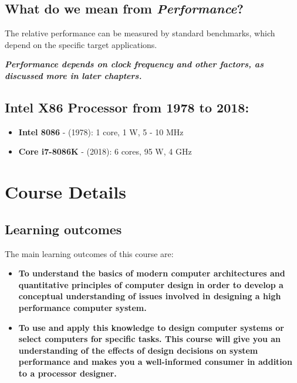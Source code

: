 \documentclass[
  12pt,
  a4paper,
]{report}
\begin{document}
\label{PerformanceQuestion}
\subsection{\texorpdfstring{What do we mean from
\emph{Performance}?}{What do we mean from Performance?}}\label{what-do-we-mean-from-performance}

The relative performance can be measured by standard benchmarks, which
depend on the specific target applications.

\textbf{\emph{Performance depends on clock frequency and other factors,
as discussed more in later chapters.}}

\label{IntelX86}
\subsection{Intel X86 Processor from 1978 to
2018:}\label{intel-x86-processor-from-1978-to-2018}

\begin{itemize}
\item
  \textbf{Intel 8086} - (1978): 1 core, 1 W, 5 - 10 MHz
\item
  \textbf{Core i7-8086K} - (2018): 6 cores, 95 W, 4 GHz
\end{itemize}

\label{CourseDetails}
\section{Course Details}\label{course-details}

\label{LearningOutcomes}
\subsection{Learning outcomes}\label{learning-outcomes}

The main learning outcomes of this course are:

\begin{itemize}
\item
  \textbf{To understand the basics of modern computer architectures and
  quantitative principles of computer design in order to develop a
  conceptual understanding of issues involved in designing a high
  performance computer system.}
\item
  \textbf{To use and apply this knowledge to design computer systems or
  select computers for specific tasks. This course will give you an
  understanding of the effects of design decisions on system performance
  and makes you a well-informed consumer in addition to a processor
  designer.}
\end{itemize}
\end{document}
